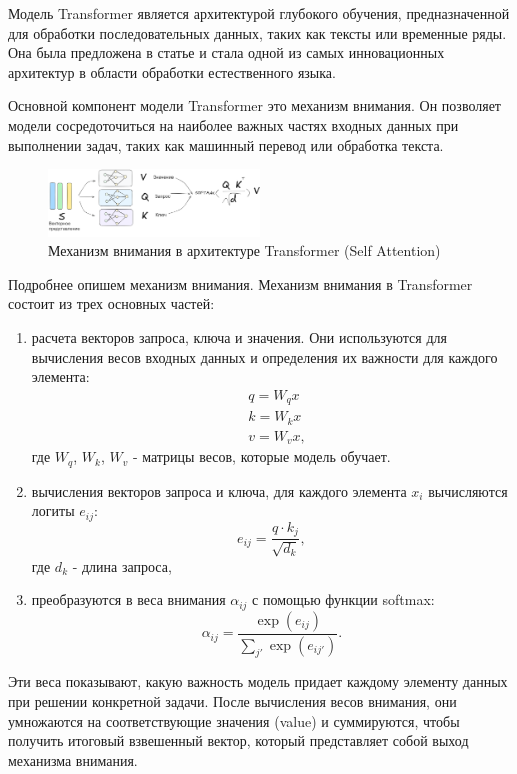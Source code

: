 Модель Transformer является архитектурой глубокого обучения, предназначенной для
обработки последовательных данных,
таких как тексты или временные ряды.
Она была предложена в статье \cite{vaswani2017attention} 
и стала одной из самых инновационных архитектур
в области обработки естественного языка.

Основной компонент модели Transformer это механизм внимания. Он позволяет модели сосредоточиться 
на наиболее важных частях входных данных при выполнении задач, таких как машинный перевод или обработка текста.

\begin{figure}[h]
    \centering
    \includegraphics[width=0.5\textwidth]{assets/ml/nn/transformer.excalidraw.png}
    \caption{Механизм внимания в архитектуре Transformer (Self Attention) \cite{vaswani2017attention} }
    \label{self_attention}
\end{figure}

Подробнее опишем механизм внимания.
Механизм внимания в Transformer состоит из трех основных частей:\begin{enumerate}
    \item  расчета векторов запроса, ключа и значения.
    Они используются для вычисления весов входных данных и определения их важности для каждого элемента:
    \begin{equation}
        \begin{aligned}
            &q =W_q x \\ 
            &k = W_k x \\
            &v = W_v x,
        \end{aligned}
    \end{equation}
    где \(W_q\), \(W_k\), \(W_v\) - матрицы весов, которые модель обучает.
    \item вычисления векторов запроса и ключа, для каждого элемента \(x_i\) вычисляются логиты \(e_{ij}\):
    \begin{equation}
        e_{ij} = \frac{q \cdot k_j}{\sqrt{d_k}} ,
    \end{equation}
    где \(d_k\) - длина запроса,
    \item преобразуются в веса внимания \( \alpha_{ij} \) с помощью функции softmax:
    \begin{equation}
        \alpha_{ij} = \frac{\exp(e_{ij})}{\sum_{j'} \exp(e_{ij'})}.
    \end{equation}
\end{enumerate}

Эти веса показывают, какую важность модель придает каждому элементу данных при решении конкретной задачи. 
После вычисления весов внимания, они умножаются на соответствующие значения (value) и суммируются, чтобы получить итоговый взвешенный вектор, который представляет собой выход механизма внимания.